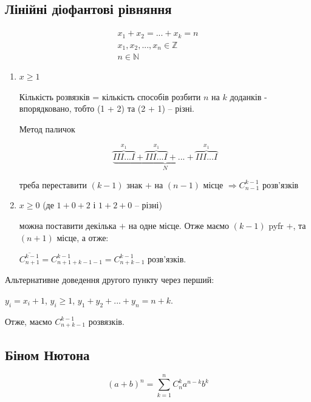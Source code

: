 \subsection{Лінійні діофантові рівняння}

\begin{gather*}
    x_1 + x_2 = ... + x_k = n\\
    x_1, x_2, ..., x_n \in \mathbb{Z}\\
    n \in \mathbb{N}
\end{gather*}

\begin{enumerate}
    \item $x \geqslant 1$

    Кількість розвязків = кількість способів розбити $n$ на $k$ доданків - впорядковано, тобто (1 + 2) та (2 + 1) -- різні.

    Метод паличок
    
    $$\underbrace{\overbrace{III...I}^{x_1} + \overbrace{III...I}^{x_1} + ... + \overbrace{III...I}^{x_1}}_{N}$$

    треба переставити $(k - 1)$ знак $+$ на $(n - 1)$ місце $\Rightarrow C_{n - 1}^{k - 1}$ розв'язків

    \item $x \geqslant 0$ (де $1 + 0 + 2$ і $1 + 2 + 0$ -- різні)
    
    можна поставити декілька $+$ на одне місце. Отже маємо $(k - 1)$ pyfr $+$, та $(n + 1)$ місце, а отже:

    $\overline{C_{n + 1}^{k - 1}} = C_{n + 1 + k - 1 - 1}^{k - 1} = C_{n + k - 1}^{k - 1}$ розв'язків.
\end{enumerate}

\begin{remark}
    Альтернативне доведення другого пункту через перший:
    
    $y_i = x_i + 1$, $y_i \geqslant 1$, $y_1 + y_2 + ... + y_n = n + k$.

    Отже, маємо $C_{n + k - 1}^{k - 1}$ розвязків.
\end{remark}

\subsection{Біном Нютона}

\begin{equation}
    (a + b)^n = \sum\limits_{k = 1}^{n} C_{n}^{k}a^{n - k} b^{k}
\end{equation}

